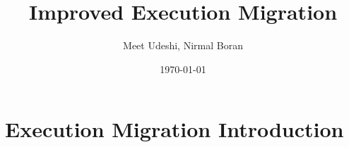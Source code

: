 \documentclass[10pt]{beamer}
\title[Improved Execution Migration]{Improved Execution Migration} %
\author{Meet Udeshi, Nirmal Boran} %
\institute[IIT Bombay] %
{
IIT Bombay\\ %
}
\date{\today} %
\begin{document}
\begin{frame}
\titlepage %
\end{frame}


\section{Execution Migration Introduction} %

\end{document}
